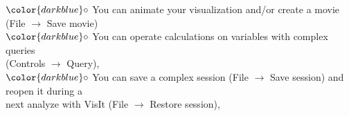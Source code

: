 \documentclass[10pt, hyperref={unicode=true,pdfusetitle, bookmarks=true,bookmarksnumbered=false,bookmarksopen=false, breaklinks=false,pdfborder={0 0l 1},backref=true,colorlinks=true,linkcolor=darkblue,pageanchor}]{beamer}
\begin{document}
\begin{frame}
\begin{block}{}
\hspace{1cm} $\color{darkblue}\circ$ {\small{You can animate your visualization and/or create a movie (File $\rightarrow$ Save movie)}}\\

\hspace{1cm} $\color{darkblue}\circ$ {\small{You can operate calculations on variables with complex queries \\
\hspace{1.3cm} (Controls $\rightarrow$ Query),}}\\

\hspace{1cm} $\color{darkblue}\circ$ {\small{You can save a complex session (File $\rightarrow$ Save session) and reopen it during a \\
\hspace{1.3cm} next analyze with VisIt (File $\rightarrow$ Restore session),}}



\end{block}
\end{frame}
\end{document}
